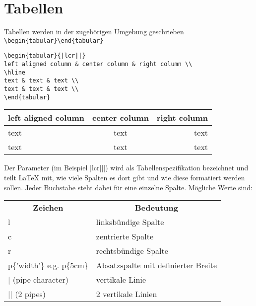 \chapter{Tabellen}

Tabellen werden in der zugehörigen Umgebung geschrieben \verb|\begin{tabular}\end{tabular}|
\begin{lstlisting}[style=Latex,caption={Einfache Tabelle},label=lst:tab1]
\begin{tabular}{|lcr||}
left aligned column & center column & right column \\
\hline
text & text & text \\
text & text & text \\
\end{tabular}
\end{lstlisting}

\begin{tabular}{|lcr||}
	left aligned column & center column & right column \\
	\hline
	text & text & text \\
	text & text & text \\
\end{tabular}
\bigskip

Der Parameter (im Beispiel |lcr|||) wird als Tabellenspezifikation bezeichnet und teilt \LaTeX{} mit, wie viele Spalten es dort gibt und wie diese formatiert werden sollen. Jeder Buchstabe steht dabei für eine einzelne Spalte. Mögliche Werte sind:

\begin{table}[ht]
	\centering
	\begin{tabular}{ll}
		\multicolumn{1}{c}{\textbf{Zeichen}} & \multicolumn{1}{c}{\textbf{Bedeutung}}       \\
		l                           & linksbündige Spalte                 \\
		c                           & zentrierte Spalte                   \\
		r                           & rechtsbündige Spalte                \\
		p\{'width'\} e.g. p\{5cm\}  & Absatzspalte mit definierter Breite \\
		| (pipe character)          & vertikale Linie                     \\
		|| (2 pipes)                & 2 vertikale Linien                 
	\end{tabular}
\end{table}

